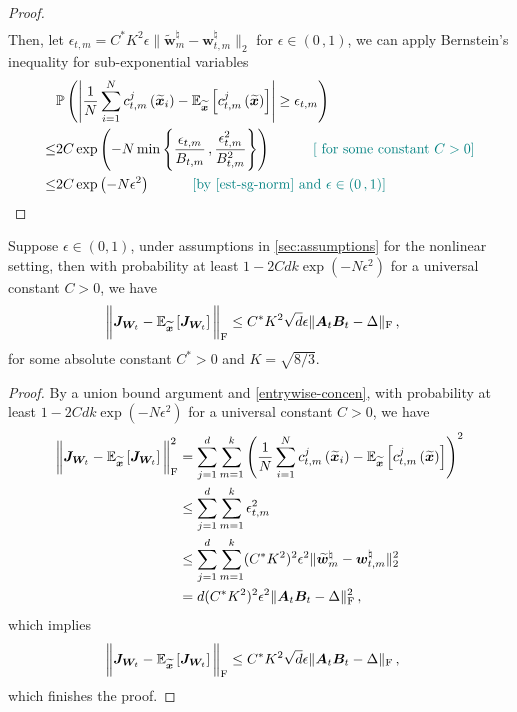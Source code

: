 \begin{proof}
\begin{align}
\end{align}
Then, let $\epsilon_{t,m}=C^* K^2 \epsilon \|\widetilde{\bm w}_m^\natural-{\bm w}_{t,m}^\natural\|_2$ for $\epsilon\in(0\,,1)$, we can apply Bernstein’s inequality for sub-exponential variables \citet[Corollary 2.8.3]{vershynin2018high}
\begin{align*}
    & \mathbb{P}\left(\left|\frac{1}{N}\sum_{i=1}^N c^j_{t,m}\left(\widetilde{\bm x}_i\right)-\mathbb{E}_{\widetilde{\bm x}}\left[ c^j_{t,m}\left(\widetilde{\bm x}\right)\right]\right|\geq \epsilon_{t,m}\right)\\
    \leq & 2C\operatorname{exp}\left(- N \min \left\{\frac{\epsilon_{t,m}}{B_{t,m}}\,,\frac{\epsilon_{t,m}^2}{B_{t,m}^2}\right\}\right)\quad\tag*{\color{teal}$[\text{ for some constant }C>0]$}\\
    \leq & 2C\operatorname{exp}\left(- N\epsilon^2\right)\quad \tag*{\color{teal}[by \cref{est-sg-norm} and $\epsilon\in(0\,,1)$]}
\end{align*}
\end{proof}
\begin{theorem} \label{emp-concen}
Suppose $\epsilon \in (0,1)$, under assumptions in \cref{sec:assumptions} for the nonlinear setting, then with probability at least $1-2Cdk\operatorname{exp}\left(- N\epsilon^2\right)$ for a universal constant $C>0$, we have
\begin{align*}
    \bigg\|\bm J_{\bm W_t} - \mathbb{E}_{\widetilde{\bm x}}\left[\bm J_{\bm W_t} \right]\bigg\|_{\rm F} & \leq C^* K^2\sqrt{d}\epsilon \|\bm A_t \bm B_t - \Delta\|_{\rm F}\,,
\end{align*}
for some absolute constant $C^*>0$ and $K=\sqrt{8/3}$.
\end{theorem}
\begin{proof}
By a union bound argument and \cref{entrywise-concen}, with probability at least $1-2Cdk\operatorname{exp}\left(-N\epsilon^2\right)$ for a universal constant $C>0$, we have
    \begin{align*}
    \bigg\|\bm J_{\bm W_t} - \mathbb{E}_{\widetilde{\bm x}}\left[\bm J_{\bm W_t}\right]\bigg\|^2_{\rm F} & = \sum_{j=1}^d\sum_{m=1}^k \left(\frac{1}{N}\sum_{i=1}^N c^j_{t,m}\left(\widetilde{\bm x}_i\right)-\mathbb{E}_{\widetilde{\bm x}}\left[ c^j_{t,m}\left(\widetilde{\bm x}\right)\right]\right)^2\\
    & \leq \sum_{j=1}^d\sum_{m=1}^k \epsilon^2_{t,m}\\
    & \leq \sum_{j=1}^d \sum_{m=1}^k (C^* K^2)^2 \epsilon^2 \|\widetilde{\bm w}_m^\natural-{\bm w}_{t,m}^\natural\|^2_2\\
    & = d (C^* K^2)^2 \epsilon^2 \|\bm A_t \bm B_t - \Delta\|^2_{\rm F}\,,
\end{align*}
which implies
\begin{align*}
    \bigg\|\bm J_{\bm W_t} - \mathbb{E}_{\widetilde{\bm x}}\left[\bm J_{\bm W_t}\right]\bigg\|_{\rm F} & \leq C^* K^2\sqrt{d}\epsilon \|\bm A_t \bm B_t - \Delta\|_{\rm F}\,,
\end{align*}
which finishes the proof.
\end{proof}

